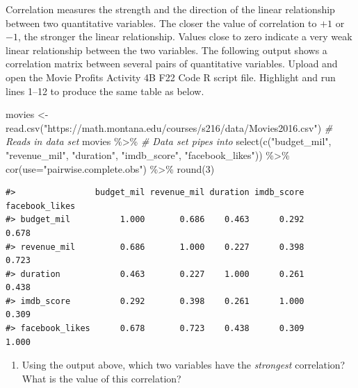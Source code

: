 \documentclass[
]{report}
\newenvironment{Shaded}{\begin{snugshade}}{\end{snugshade}}
\newcommand{\AttributeTok}[1]{\textcolor[rgb]{0.77,0.63,0.00}{#1}}
\newcommand{\CommentTok}[1]{\textcolor[rgb]{0.56,0.35,0.01}{\textit{#1}}}
\newcommand{\DecValTok}[1]{\textcolor[rgb]{0.00,0.00,0.81}{#1}}
\newcommand{\FunctionTok}[1]{\textcolor[rgb]{0.00,0.00,0.00}{#1}}
\newcommand{\NormalTok}[1]{#1}
\newcommand{\OtherTok}[1]{\textcolor[rgb]{0.56,0.35,0.01}{#1}}
\newcommand{\SpecialCharTok}[1]{\textcolor[rgb]{0.00,0.00,0.00}{#1}}
\newcommand{\StringTok}[1]{\textcolor[rgb]{0.31,0.60,0.02}{#1}}
\providecommand{\tightlist}{%
  \setlength{\itemsep}{0pt}\setlength{\parskip}{0pt}}
\begin{document}
Correlation measures the strength and the direction of the linear relationship between two quantitative variables. The closer the value of correlation to \(+1\) or \(-1\), the stronger the linear relationship. Values close to zero indicate a very weak linear relationship between the two variables. The following output shows a correlation matrix between several pairs of quantitative variables. Upload and open the Movie Profits Activity 4B F22 Code R script file. Highlight and run lines 1--12 to produce the same table as below.

\begin{Shaded}
\begin{Highlighting}[]
\NormalTok{movies }\OtherTok{\textless{}{-}} \FunctionTok{read.csv}\NormalTok{(}\StringTok{"https://math.montana.edu/courses/s216/data/Movies2016.csv"}\NormalTok{) }\CommentTok{\# Reads in data set}
\NormalTok{movies }\SpecialCharTok{\%\textgreater{}\%}  \CommentTok{\# Data set pipes into}
  \FunctionTok{select}\NormalTok{(}\FunctionTok{c}\NormalTok{(}\StringTok{"budget\_mil"}\NormalTok{, }\StringTok{"revenue\_mil"}\NormalTok{, }
           \StringTok{"duration"}\NormalTok{, }\StringTok{"imdb\_score"}\NormalTok{, }
           \StringTok{"facebook\_likes"}\NormalTok{)) }\SpecialCharTok{\%\textgreater{}\%}
  \FunctionTok{cor}\NormalTok{(}\AttributeTok{use=}\StringTok{"pairwise.complete.obs"}\NormalTok{) }\SpecialCharTok{\%\textgreater{}\%}
  \FunctionTok{round}\NormalTok{(}\DecValTok{3}\NormalTok{)}
\end{Highlighting}
\end{Shaded}

\begin{verbatim}
#>                budget_mil revenue_mil duration imdb_score facebook_likes
#> budget_mil          1.000       0.686    0.463      0.292          0.678
#> revenue_mil         0.686       1.000    0.227      0.398          0.723
#> duration            0.463       0.227    1.000      0.261          0.438
#> imdb_score          0.292       0.398    0.261      1.000          0.309
#> facebook_likes      0.678       0.723    0.438      0.309          1.000
\end{verbatim}

\begin{enumerate}
\def\labelenumi{\arabic{enumi}.}
\tightlist
\item
  Using the output above, which two variables have the \emph{strongest} correlation? What is the value of this correlation?
\end{enumerate}
\end{document}
